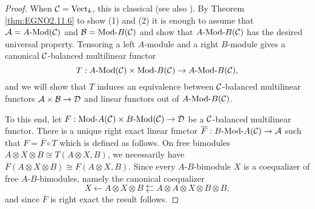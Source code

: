 \documentclass{amsart}
\begin{document}
\begin{proof}
	When $\mathcal C = \mathrm{Vect}_k$, this is classical \cite[Prop 5.13]{MR1106898} (see also \cite[Prop 1.46.2]{EGNO}).
	By Theorem \ref{thm:EGNO2.11.6} to show (1) and (2) it is enough to assume that $\cA = \Mod{A}{}(\cC)$ and $\cB = \Mod{}{B}(\cC)$ and show that $\Mod{A }{B}(\cC)$ has the desired universal property. Tensoring a left $A$-module and a right $B$-module gives a canonical $\mathcal C$-balanced multilinear functor 
		\begin{equation*}
			T: \Mod{A}{}(\cC) \times \Mod{}{B}(\cC) \to \Mod{A}{B}(\cC),  
		\end{equation*}
and we will show that $T$ induces an equivalence between $\mathcal C$-balanced multilinear functors $\mathcal A \times \mathcal B \to \mathcal D$ and linear functors out of $\Mod{A}{B}(\cC)$.
	
	To this end, let $F:\Mod{}{A}(\cC) \times \Mod{B}{}(\cC) \to \cD$ be a $\mathcal C$-balanced multilinear functor.  
	There is a unique right exact linear functor $\overline F: \Mod{B}{A}(\cC) \to \cA$ such that $F = \overline{F} \circ T$ which is defined as follows. On free bimodules $A \otimes X \otimes B \cong T(A \otimes X, B)$, we necessarily have $\overline{F}(A \otimes X \otimes B) \cong F(A \otimes X, B)$. Since  every $A$-$B$-bimodule $X$ is a coequalizer of free $A$-$B$-bimodules, namely the canonical coequalizer  
	\begin{equation*}
		X \leftarrow A \otimes X \otimes B \leftleftarrows A \otimes A \otimes X \otimes B \otimes B,
	\end{equation*}
	and since $\overline{F}$ is right exact the result follows.
%	
\end{proof}
\end{document}
